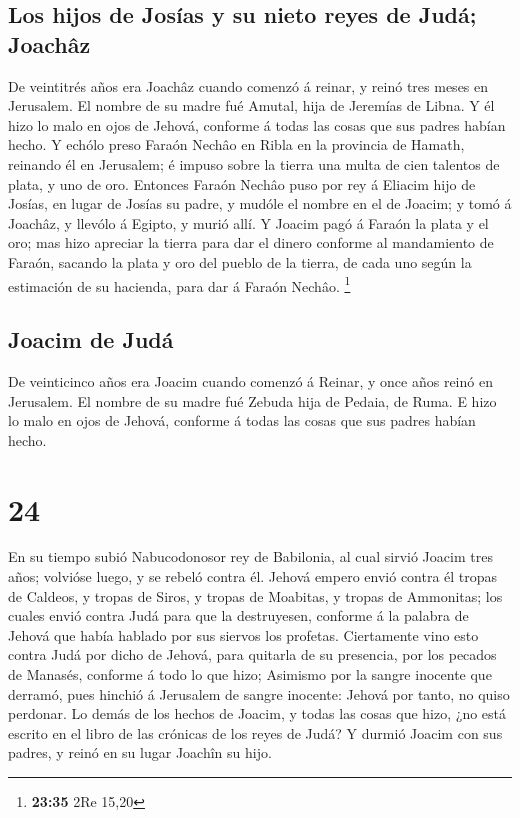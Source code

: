 \hypertarget{los-hijos-de-josuxedas-y-su-nieto-reyes-de-juduxe1-joachuxe2z}{%
\subsection{Los hijos de Josías y su nieto reyes de Judá;
Joachâz}\label{los-hijos-de-josuxedas-y-su-nieto-reyes-de-juduxe1-joachuxe2z}}

 De veintitrés años era Joachâz cuando comenzó á reinar, y
reinó tres meses en Jerusalem. El nombre de su madre fué Amutal, hija de
Jeremías de Libna.  Y él hizo lo malo en ojos de Jehová,
conforme á todas las cosas que sus padres habían hecho.  Y
echólo preso Faraón Nechâo en Ribla en la provincia de Hamath, reinando
él en Jerusalem; é impuso sobre la tierra una multa de cien talentos de
plata, y uno de oro.  Entonces Faraón Nechâo puso por rey á
Eliacim hijo de Josías, en lugar de Josías su padre, y mudóle el nombre
en el de Joacim; y tomó á Joachâz, y llevólo á Egipto, y murió allí.
 Y Joacim pagó á Faraón la plata y el oro; mas hizo
apreciar la tierra para dar el dinero conforme al mandamiento de Faraón,
sacando la plata y oro del pueblo de la tierra, de cada uno según la
estimación de su hacienda, para dar á Faraón Nechâo. \footnote{\textbf{23:35}
  2Re 15,20}

\hypertarget{joacim-de-juduxe1}{%
\subsection{Joacim de Judá}\label{joacim-de-juduxe1}}

 De veinticinco años era Joacim cuando comenzó á Reinar, y
once años reinó en Jerusalem. El nombre de su madre fué Zebuda hija de
Pedaia, de Ruma.  E hizo lo malo en ojos de Jehová,
conforme á todas las cosas que sus padres habían hecho.

\hypertarget{section-23}{%
\section{24}\label{section-23}}

 En su tiempo subió Nabucodonosor rey de Babilonia, al cual
sirvió Joacim tres años; volvióse luego, y se rebeló contra él.
 Jehová empero envió contra él tropas de Caldeos, y tropas
de Siros, y tropas de Moabitas, y tropas de Ammonitas; los cuales envió
contra Judá para que la destruyesen, conforme á la palabra de Jehová que
había hablado por sus siervos los profetas.  Ciertamente
vino esto contra Judá por dicho de Jehová, para quitarla de su
presencia, por los pecados de Manasés, conforme á todo lo que hizo;
 Asimismo por la sangre inocente que derramó, pues hinchió á
Jerusalem de sangre inocente: Jehová por tanto, no quiso perdonar.
 Lo demás de los hechos de Joacim, y todas las cosas que
hizo, ¿no está escrito en el libro de las crónicas de los reyes de Judá?
 Y durmió Joacim con sus padres, y reinó en su lugar Joachîn
su hijo.

